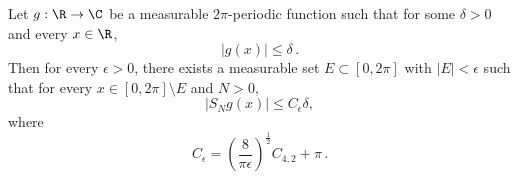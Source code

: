 \begin{lemma}
    \label{partial-Fourier-sums-of-small}
    \leanok
    Let $g:\R\to\C$ be a measurable $2\pi$-periodic function such that for some $\delta>0$ and every $x\in\R$,
    \begin{equation} \label{g-small}
        |g(x)|\le \delta \,.
    \end{equation}
    Then for every $\epsilon>0$, there exists a measurable set $E\subset [0,2\pi]$ with $|E|<\epsilon$ such that for every $x\in [0,2\pi]\setminus E$ and $N>0$,
    \begin{equation}  \label{S-Ng-small}
        |S_N g(x)|\le C_\epsilon \delta,
    \end{equation}
    where
    \begin{equation} \label{C-epsilon-def}
        C_\epsilon = \left(\frac{8}{\pi\epsilon}\right)^\frac{1}{2} C_{4,2} + \pi \,.
    \end{equation}
\end{lemma}

